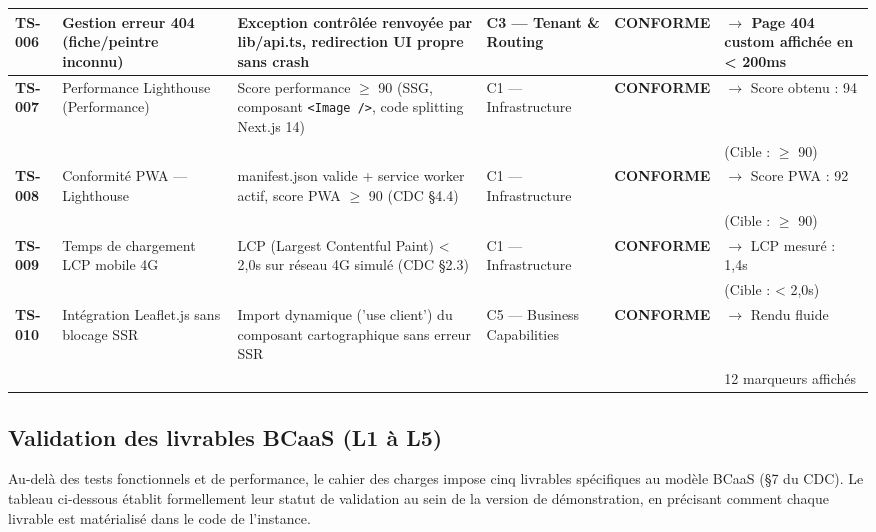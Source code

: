 \documentclass[12pt,a4paper]{report}
\begin{document}
\begin{table}[H]
\begin{tabular}{|p{}|p{}|p{}|p{}|p{}|p{}|}
\hline
\textbf{TS-006} & Gestion erreur 404 (fiche/peintre inconnu) & Exception contrôlée renvoyée par lib/api.ts, redirection UI propre sans crash & C3 --- Tenant \& Routing & \textbf{CONFORME} & $\rightarrow$ Page 404 custom affichée en < 200ms \\
\hline
\textbf{TS-007} & Performance Lighthouse (Performance) & Score performance $\geq$ 90 (SSG, composant \texttt{<Image />}, code splitting Next.js 14) & C1 --- Infrastructure & \textbf{CONFORME} & $\rightarrow$ Score obtenu : 94 \\
 & & & & & (Cible : $\geq$ 90) \\
\hline
\textbf{TS-008} & Conformité PWA --- Lighthouse & manifest.json valide + service worker actif, score PWA $\geq$ 90 (CDC §4.4) & C1 --- Infrastructure & \textbf{CONFORME} & $\rightarrow$ Score PWA : 92 \\
 & & & & & (Cible : $\geq$ 90) \\
\hline
\textbf{TS-009} & Temps de chargement LCP mobile 4G & LCP (Largest Contentful Paint) < 2,0s sur réseau 4G simulé (CDC §2.3) & C1 --- Infrastructure & \textbf{CONFORME} & $\rightarrow$ LCP mesuré : 1,4s \\
 & & & & & (Cible : < 2,0s) \\
\hline
\textbf{TS-010} & Intégration Leaflet.js sans blocage SSR & Import dynamique ('use client') du composant cartographique sans erreur SSR & C5 --- Business Capabilities & \textbf{CONFORME} & $\rightarrow$ Rendu fluide \\
 & & & & & 12 marqueurs affichés \\
\hline
\end{tabular}
\end{table}

\subsection{Validation des livrables BCaaS (L1 à L5)}

Au-delà des tests fonctionnels et de performance, le cahier des charges impose cinq livrables spécifiques au modèle BCaaS (§7 du CDC). Le tableau ci-dessous établit formellement leur statut de validation au sein de la version de démonstration, en précisant comment chaque livrable est matérialisé dans le code de l'instance.
\end{document}
